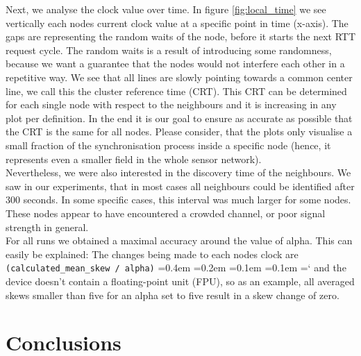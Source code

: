 \documentclass{llncs}
\newcommand{\code}[1]{%
	\texttt{#1}%
	\fontdimen2\font=0.4em
	\fontdimen3\font=0.2em
	\fontdimen4\font=0.1em
	\fontdimen7\font=0.1em
	\hyphenchar\font=`\-
}
\begin{document}
\noindent Next, we analyse the clock value over time. In figure \ref{fig:local_time} we see vertically each nodes current clock value at a specific point in time (x-axis). The gaps are representing the random waits of the node, before it starts the next RTT request cycle. The random waits is a result of introducing some randomness, because we want a guarantee that the nodes would not interfere each other in a repetitive way. We see that all lines are slowly pointing towards a common center line, we call this the cluster reference time (CRT). This CRT can be determined for each single node with respect to the neighbours and it is  increasing in any plot per definition. In the end it is our goal to ensure as accurate as possible that the CRT is the same for all nodes. Please consider, that the plots only visualise a small fraction of the synchronisation process inside a specific node (hence, it represents even a smaller field in the whole sensor network).\\

\noindent Nevertheless, we were also interested in the discovery time of the neighbours. We saw in our experiments, that  in most cases all neighbours could be identified after 300 seconds. In some specific cases, this interval was much larger for some nodes. These nodes appear to have encountered a crowded channel, or poor signal strength in general.\\

\noindent For all runs we obtained a maximal accuracy around the value of alpha. This can easily be explained: The changes being made to each nodes clock are \code{(calculated\_mean\_skew / alpha)} and the device doesn't contain a float\-ing-point unit (FPU), so as an example, all averaged skews smaller than five for an alpha set to five result in a skew change of zero.

\section{Conclusions}
\end{document}

